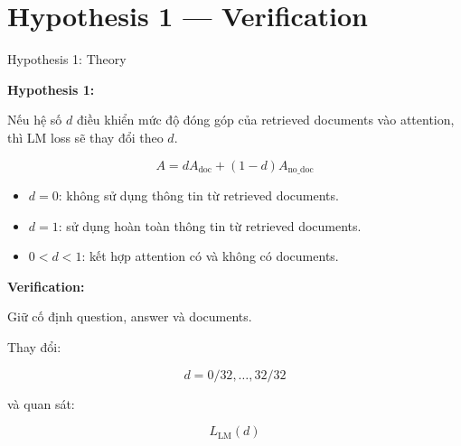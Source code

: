 
\section{Hypothesis 1 — Verification}

\begin{frame}{Hypothesis 1: Theory}

\textbf{Hypothesis 1:}

Nếu hệ số $d$ điều khiển mức độ đóng góp của retrieved documents vào attention, thì LM loss sẽ thay đổi theo $d$.

\vspace{0.35cm}

\[
A
=
dA_{\mathrm{doc}}
+
(1-d)A_{\mathrm{no\_doc}}
\]

\vspace{0.2cm}

\begin{itemize}
    \item $d=0$: không sử dụng thông tin từ retrieved documents.
    \item $d=1$: sử dụng hoàn toàn thông tin từ retrieved documents.
    \item $0<d<1$: kết hợp attention có và không có documents.
\end{itemize}

\vspace{0.2cm}

\textbf{Verification:}

Giữ cố định question, answer và documents.

\vspace{0.1cm}

Thay đổi:

\[
d=0/32,\ldots,32/32
\]

\vspace{0.1cm}

và quan sát:

\[
L_{\mathrm{LM}}(d)
\]

\end{frame}



